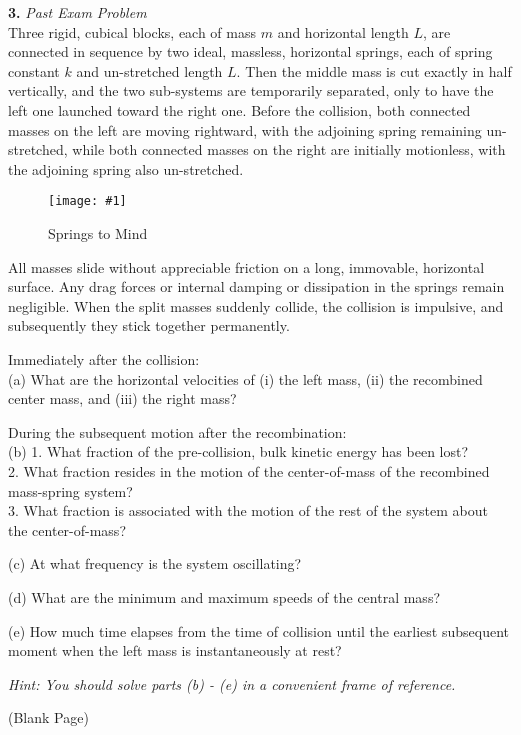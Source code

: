 \documentclass[11pt]{article}
\newcommand{\fig}[4]{
    \begin{figure}[H]
        \centering
        \texttt{[image: \#1]}
        \caption{#2}
        \label{exp4fit}
    \end{figure}
}
\theoremstyle{gangnamstyle}{\newtheorem{definition}{Definition}[]}
\theoremstyle{gangnamstyle}{\newtheorem{example}{Example}[]}
\theoremstyle{gangnamstyle}{\newtheorem{problem}{Problem}[]}
\begin{document}
\textbf{3.} \textit{Past Exam Problem} \\
Three rigid, cubical blocks, each of mass $m$ and horizontal length $L$, are connected in sequence by two ideal, massless, horizontal springs, each of spring constant $k$ and un-stretched length $L$. Then the middle mass is cut exactly in half vertically, and the two sub-systems are temporarily separated, only to have the left one launched toward the right one. Before the collision, both connected masses on the left are moving rightward, with the adjoining spring remaining un-stretched, while both connected masses on the right are initially motionless, with the adjoining spring also un-stretched.
\fig{figs/0806/charman.jpg}{Springs to Mind}{0.5}{0}
All masses slide without appreciable friction on a long, immovable, horizontal surface. Any drag forces or internal damping or dissipation in the springs remain negligible. When the split masses suddenly collide, the collision is impulsive, and subsequently they stick together permanently. 

Immediately after the collision: \\
(a) What are the horizontal velocities of (i) the left mass, (ii) the recombined center mass, and (iii) the right mass? 

During the subsequent motion after the recombination: \\
(b) 1. What fraction of the pre-collision, bulk kinetic energy has been lost? \\
2. What fraction resides in the motion of the center-of-mass of the recombined mass-spring system? \\
3. What fraction is associated with the motion of the rest of the system about the center-of-mass?

(c) At what frequency is the system oscillating? 

(d) What are the minimum and maximum speeds of the central mass?

(e) How much time elapses from the time of collision until the earliest subsequent moment when the left mass is instantaneously at rest?

\textit{Hint: You should solve parts (b) - (e) in a convenient frame of reference.}

\pagebreak

\begin{center}
(Blank Page)
\end{center}

\pagebreak
\end{document}
